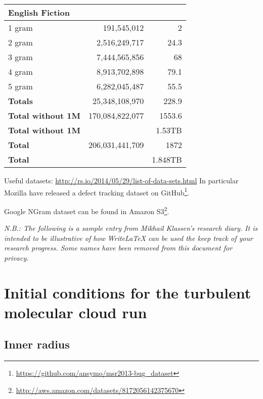 \documentclass[a4paper]{tufte-handout}
\begin{document}
\begin{table}[p]
\begin{tabular}{lrr}
    \midrule
    English Fiction\\
    \midrule
    1 gram	&	191,545,012	&	2\\
    2 gram	&	2,516,249,717	&	24.3\\
    3 gram	&	7,444,565,856	&	68\\
    4 gram	&	8,913,702,898	&	79.1\\
    5 gram	&	6,282,045,487	&	55.5\\
    \textbf{Totals}	& 25,348,108,970	&	228.9\\
    \midrule
    \textbf{Total without 1M}  &	170,084,822,077 &	1553.6\\
    \textbf{Total without 1M} &  &	1.53TB\\
    \textbf{Total}	& 206,031,441,709 &	1872\\
    \textbf{Total}	& &	1.848TB\\
  \end{tabular}
\end{table}


\hrulefill



Useful datasets: \url{http://rs.io/2014/05/29/list-of-data-sets.html} In particular Mozilla have released a defect tracking dataset on GitHub\footnote{\url{https://github.com/ansymo/msr2013-bug_dataset}}\citep{Lamkanfi+13}.

Google NGram dataset can be found in Amazon S3\footnote{\url{http://aws.amazon.com/datasets/8172056142375670}}.

\hrulefill



\textit{N.B.: The following is a sample entry from Mikhail Klassen's research diary. It is intended to be illustrative of how WriteLaTeX can be used the keep track of your research progress. Some names have been removed from this document for privacy.}

\section*{Initial conditions for the turbulent molecular cloud run}

\subsection*{Inner radius}
\end{document}
